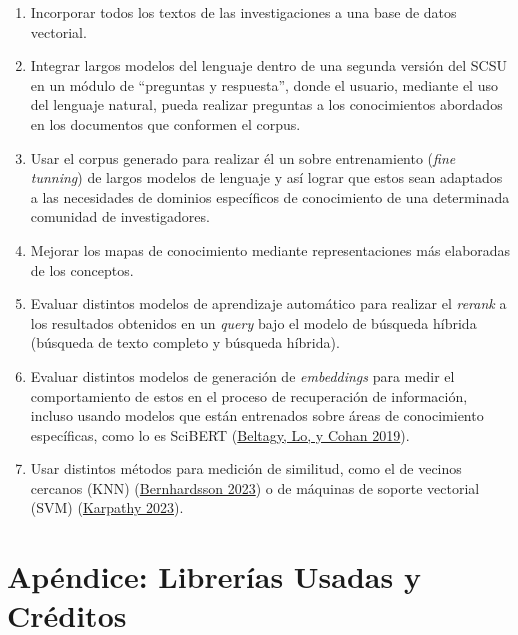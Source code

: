 \documentclass[
  12pt,
  openany]{book}
\begin{document}
\begin{enumerate}
  \begin{enumerate}
  \def\labelenumii{\roman{enumii}.}
  \item
    Incorporar todos los textos de las investigaciones a una base de datos vectorial.
  \item
    Integrar largos modelos del lenguaje dentro de una segunda versión del SCSU en un módulo de ``preguntas y respuesta'', donde el usuario, mediante el uso del lenguaje natural, pueda realizar preguntas a los conocimientos abordados en los documentos que conformen el corpus.
  \item
    Usar el corpus generado para realizar él un sobre entrenamiento (\emph{fine tunning}) de largos modelos de lenguaje y así lograr que estos sean adaptados a las necesidades de dominios específicos de conocimiento de una determinada comunidad de investigadores.
  \item
    Mejorar los mapas de conocimiento mediante representaciones más elaboradas de los conceptos.
  \item
    Evaluar distintos modelos de aprendizaje automático para realizar el \emph{rerank} a los resultados obtenidos en un \emph{query} bajo el modelo de búsqueda híbrida (búsqueda de texto completo y búsqueda híbrida).
  \item
    Evaluar distintos modelos de generación de \emph{embeddings} para medir el comportamiento de estos en el proceso de recuperación de información, incluso usando modelos que están entrenados sobre áreas de conocimiento específicas, como lo es SciBERT (\protect\hyperlink{ref-beltagy2019}{Beltagy, Lo, y Cohan 2019}).
  \item
    Usar distintos métodos para medición de similitud, como el de vecinos cercanos (KNN) (\protect\hyperlink{ref-annoy2023}{Bernhardsson 2023}) o de máquinas de soporte vectorial (SVM) (\protect\hyperlink{ref-svm2023}{Karpathy 2023}).
  \end{enumerate}
\end{enumerate}

\hypertarget{apuxe9ndice-libreruxedas-usadas-y-cruxe9ditos}{%
\chapter*{Apéndice: Librerías Usadas y Créditos}\label{apuxe9ndice-libreruxedas-usadas-y-cruxe9ditos}}
\end{document}
